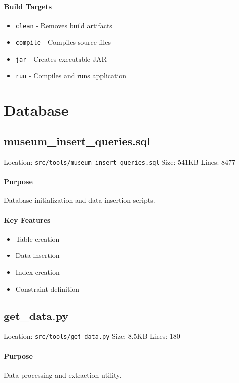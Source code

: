 \documentclass[12pt,a4paper]{article}
\begin{document}
\paragraph{Build Targets}
\begin{itemize}
    \item \texttt{clean} - Removes build artifacts
    \item \texttt{compile} - Compiles source files
    \item \texttt{jar} - Creates executable JAR
    \item \texttt{run} - Compiles and runs application
\end{itemize}

\section{Database}
\subsection{museum\_insert\_queries.sql}
Location: \texttt{src/tools/museum\_insert\_queries.sql}
Size: 541KB
Lines: 8477

\paragraph{Purpose}
Database initialization and data insertion scripts.

\paragraph{Key Features}
\begin{itemize}
    \item Table creation
    \item Data insertion
    \item Index creation
    \item Constraint definition
\end{itemize}

\subsection{get\_data.py}
Location: \texttt{src/tools/get\_data.py}
Size: 8.5KB
Lines: 180

\paragraph{Purpose}
Data processing and extraction utility.
\end{document}
